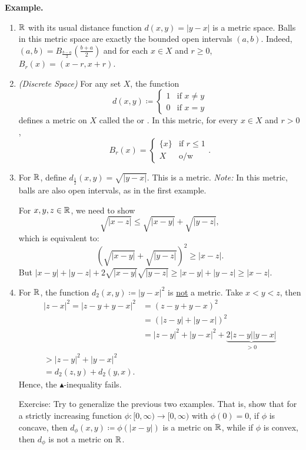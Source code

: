 \documentclass[14pt,oneside]{extarticle}
\newenvironment{example}{
    \par
    \vspace{5pt}
    \noindent\textbf{Example.}
    \begin{tcolorbox}[
        blanker, breakable, left=5mm, parbox=false,
        before upper={\parindent15pt},
        after skip=10pt,
        borderline west={1mm}{0pt}{solarized-magenta!50}]
}{
    \end{tcolorbox}
    \vspace{5pt}
}
\begin{document}
\begin{example}
  \begin{enumerate}[label=$\circ$, leftmargin=*, itemsep=1em]
      \item $\mathbb{R}$ with its usual distance function $d(x,y) = |y-x|$ is a metric space. Balls in this metric space are exactly the bounded open intervals $(a,b)$. Indeed, $(a,b) = B_{\frac{b-a}{2}}(\frac{b+a}{2})$ and for each $x \in X$ and $r \geq 0$, $B_r(x) = (x-r, x+r)$.
      \item \textit{(Discrete Space)} For any set $X$, the function
      \[d(x,y) \coloneqq \begin{cases}
        1 & \text{if } x \neq y \\
        0 & \text{if } x = y
      \end{cases}\]
      defines a metric on $X$ called the  or . In this metric, for every $x \in X$ and $r>0$, 
      \[B_r(x) = \begin{cases}
        \{x\} & \text{if } r \leq 1 \\
        X & \text{o/w}
      \end{cases}.\]
      \item For $\mathbb{R}$, define $d_\frac{1}{2}(x,y) = \sqrt{|y-x|}$. This is a metric. \textit{Note:} In this metric, balls are also open intervals, as in the first example.
      
      \noindent\soln{} For $x, y, z \in \mathbb{R}$, we need to show 
      \[\sqrt{|x-z|} \leq \sqrt{|x-y|} + \sqrt{|y-z|},\]
      which is equivalent to:
      \[(\sqrt{|x-y|}+\sqrt{|y-z|})^2 \geq |x-z|.\]
      But $|x-y| + |y-z| +2\sqrt{|x-y|}\sqrt{|y-z|} \geq |x-y| + |y-z| \geq |x-z|$.

      \item For $\mathbb{R}$, the function $d_2(x,y) \coloneqq |y-x|^2$ is \underline{not} a metric. Take $x < y < z$, then
      \begin{align*}
        |z-x|^2 = |z-y+y-x|^2 & = (z-y+y-x)^2 \\
                              & =(|z-y|+|y-x|)^2 \\
                              & = |z-y|^2 + |y-x|^2 + \underbrace{2|z-y||y-x|}_{> 0} \\
                              > |z-y|^2 + |y-x|^2 \\
                              = d_2(z,y) + d_2(y,x).
      \end{align*} 
      Hence, the $\blacktriangle$-inequality fails.

      Exercise: Try to generalize the previous two examples. That is, show that for a strictly increasing function $\phi: [0,\infty) \to [0, \infty)$ with $\phi(0)=0$, if $\phi$ is concave, then $d_\phi(x,y) \coloneqq \phi(|x-y|)$ is a metric on $\mathbb{R}$, while if $\phi$ is convex, then $d_\phi$ is not a metric on $\mathbb{R}$.


\end{enumerate}
\end{example}
\end{document}
